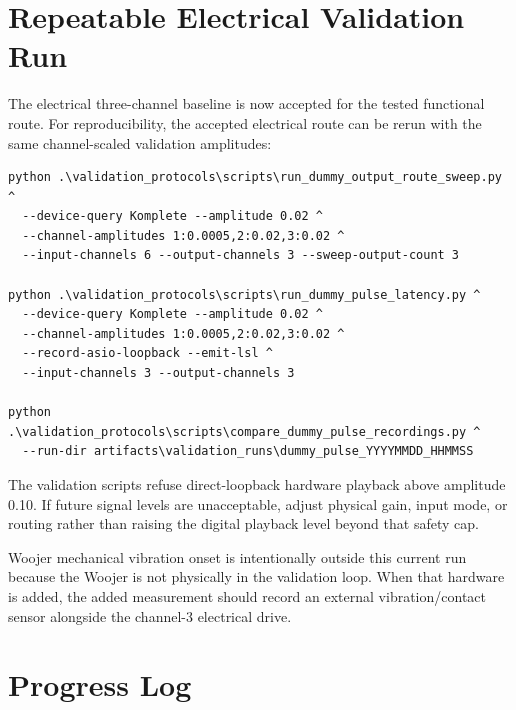 \documentclass[11pt]{article}
\begin{document}
\section{Repeatable Electrical Validation Run}

The electrical three-channel baseline is now accepted for the tested functional
route. For reproducibility, the accepted electrical route can be rerun with the same
channel-scaled validation amplitudes:

\begin{verbatim}
python .\validation_protocols\scripts\run_dummy_output_route_sweep.py ^
  --device-query Komplete --amplitude 0.02 ^
  --channel-amplitudes 1:0.0005,2:0.02,3:0.02 ^
  --input-channels 6 --output-channels 3 --sweep-output-count 3

python .\validation_protocols\scripts\run_dummy_pulse_latency.py ^
  --device-query Komplete --amplitude 0.02 ^
  --channel-amplitudes 1:0.0005,2:0.02,3:0.02 ^
  --record-asio-loopback --emit-lsl ^
  --input-channels 3 --output-channels 3

python .\validation_protocols\scripts\compare_dummy_pulse_recordings.py ^
  --run-dir artifacts\validation_runs\dummy_pulse_YYYYMMDD_HHMMSS
\end{verbatim}

The validation scripts refuse direct-loopback hardware playback above amplitude
0.10. If future signal levels are unacceptable, adjust physical gain, input
mode, or routing rather than raising the digital playback level beyond that
safety cap.

Woojer mechanical vibration onset is intentionally outside this current run
because the Woojer is not physically in the validation loop. When that hardware
is added, the added measurement should record an external vibration/contact
sensor alongside the channel-3 electrical drive.

\section{Progress Log}
\end{document}
